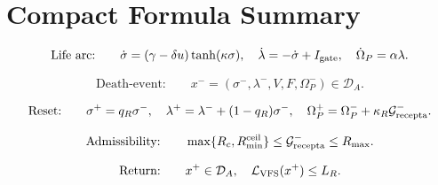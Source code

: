 \documentclass[11pt]{article}
\newcommand{\DA}{\mathcal D_A}
\newcommand{\Igate}{I_{\rm gate}}
\newcommand{\Grec}{\mathcal G_{\rm recepta}}
\newcommand{\Om}{\Omega_P}
\newcommand{\Lvfs}{\mathcal L_{\rm VFS}}
\begin{document}
\section*{Compact Formula Summary}

\[
\text{Life arc:}
\qquad
\dot\sigma=(\gamma-\delta u)\tanh(\kappa\sigma),
\quad
\dot\lambda=-\dot\sigma+\Igate,
\quad
\dot\Om=\alpha\lambda.
\]

\[
\text{Death-event:}
\qquad
x^-=(\sigma^-,\lambda^-,V,F,\Om^-)
\in\DA.
\]

\[
\text{Reset:}
\qquad
\sigma^+=q_R\sigma^-,
\quad
\lambda^+=\lambda^-+(1-q_R)\sigma^-,
\quad
\Om^+=\Om^-+\kappa_R\Grec^-.
\]

\[
\text{Admissibility:}
\qquad
\max\{R_c,R_{\min}^{\rm ceil}\}
\le
\Grec^-
\le
R_{\max}.
\]

\[
\text{Return:}
\qquad
x^+\in\DA,
\quad
\Lvfs(x^+)\le L_R.
\]
\end{document}
